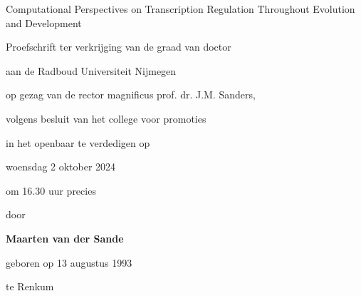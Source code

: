 \vspace*{\fill}
\begin{center}


{\huge Computational Perspectives on Transcription Regulation Throughout Evolution and Development}

\vspace{1cm}

Proefschrift ter verkrijging van de graad van doctor

\vspace{0.2cm}

aan de Radboud Universiteit Nijmegen

\vspace{0.2cm}

op gezag van de rector magnificus prof. dr. J.M. Sanders, 

\vspace{0.2cm}

volgens besluit van het college voor promoties

\vspace{0.2cm}

in het openbaar te verdedigen op 

\vspace{1cm}

woensdag 2 oktober 2024

\vspace{0.2cm}

om 16.30 uur precies

\vspace{1cm}

door

\vspace{1cm}

\textbf{Maarten van der Sande}

geboren op 13 augustus 1993

te Renkum

\end{center}
\vspace*{\fill}

\newpage


